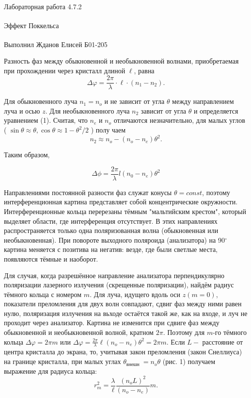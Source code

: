 \documentclass{astroedu-lab}
\begin{document}
\begin{problem}{\huge Лабораторная работа 4.7.2\\\\Эффект Поккельса\\\\Выполнил Жданов Елисей Б01-205}

Разность фаз между обыкновенной и необыкновенной волнами, приобретаемая при прохождении через кристалл длиной $\ell$, равна
$$
\Delta \varphi=\frac{2 \pi}{\lambda} \cdot \ell \cdot\left(n_1-n_2\right) .
$$

Для обыкновенного луча $n_1=n_o$ и не зависит от угла $\theta$ между направлением луча и осью $z$. Для необыкновенного луча $n_2$ зависит от угла $\theta$ и определяется уравнением (1). Считая, что $n_e$ и $n_o$ отличаются незначительно, для малых углов ( $\sin \theta \approx \theta, \cos \theta \approx 1-\theta^2 / 2$ ) полу чаем
$$
n_2 \approx n_o-\left(n_o-n_e\right) \theta^2 .
$$

Таким образом,

$$
\Delta \phi = \frac{2 \pi}{\lambda} l (n_0 - n_e) \theta^2 
$$

Направлениями постоянной разности фаз служат конусы $\theta = const$, поэтому интерференционная картина представляет собой концентрические окружности. Интерференционные кольца перерезаны тёмным "мальтийским крестом", который выделяет области, где интерференция отсутствует. В этих направлениях распространяется только одна поляризованная волна (обыкновенная или необыкновенная). При повороте выходного поляроида (анализатора) на 90$^\circ$ картина меняется с позитива на негатив: везде, где были светлые места, появляются тёмные и наоборот.

Для случая, когда разрешённое направление анализатора перпендикулярно поляризации лазерного излучения (скрещенные поляризации), найдём радиус тёмного кольца с номером $m$. Для луча, идущего вдоль оси $z(m=0)$, показатели преломления для двух волн совпадают, сдвиг фаз между ними равен нулю, поляризация излучения на вьходе остаётся такой же, как на входе, и луч не проходит через анализатор. Картина не изменится при сдвиге фаз между обыкновенной и необыкновенной волной, кратном $2 \pi$. Поэтому для $m$-го тёмного кольца $\Delta \varphi=2 \pi m$ или $\Delta \varphi=\frac{2 \pi}{\lambda} \ell\left(n_o-n_e\right) \theta^2=2 \pi m$. Если $L-$ расстояние от центра кристалла до экрана, то, учитывая закон преломления (закон Снеллиуса) на границе кристалла, при малых углах $\theta_{\text {внешн }}=n_o \theta$ (рис. 1) получаем выражение для радиуса кольца:
$$
r_m^2=\frac{\lambda}{\ell} \frac{\left(n_o L\right)^2}{\left(n_o-n_e\right)} m .
$$



\end{problem}
\end{document}
